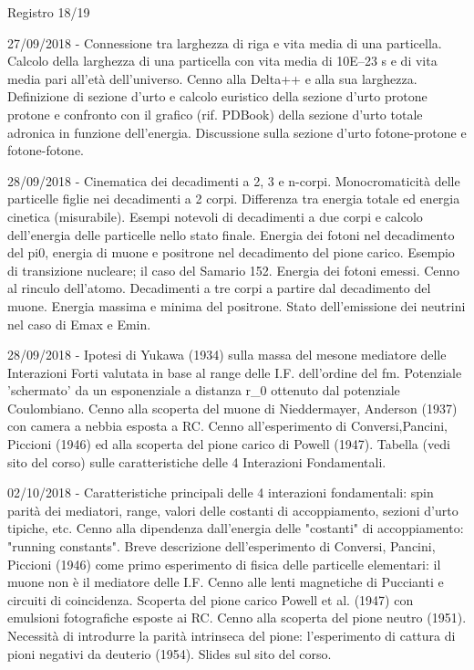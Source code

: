 \begin{frame}{Registro 18/19}
\begin{itemize}
{\item 27/09/2018 - Connessione tra larghezza di riga e vita media di una particella. Calcolo della larghezza di una particella con vita media di 10E–23 s e di vita media pari all’età dell’universo. Cenno alla Delta++ e alla sua larghezza. Definizione di sezione d’urto e calcolo euristico della sezione d’urto protone protone e confronto con il grafico (rif. PDBook) della sezione d’urto totale adronica in funzione dell’energia. Discussione sulla sezione d’urto fotone-protone e fotone-fotone.
\item 28/09/2018 - Cinematica dei decadimenti a 2, 3 e n-corpi. Monocromaticità delle particelle figlie nei decadimenti a 2 corpi. Differenza tra energia totale ed energia cinetica (misurabile). Esempi notevoli di decadimenti a due corpi e calcolo dell'energia delle particelle nello stato finale. Energia dei fotoni nel decadimento del pi0, energia di muone e positrone nel decadimento del pione carico. Esempio di transizione nucleare; il caso del Samario 152. Energia dei fotoni emessi. Cenno al rinculo dell'atomo. Decadimenti a tre corpi a partire dal decadimento del muone. Energia massima e minima del positrone. Stato dell'emissione dei neutrini nel caso di Emax e Emin.
\item 28/09/2018 - Ipotesi di Yukawa (1934) sulla massa del mesone mediatore delle Interazioni Forti valutata in base al range delle I.F. dell'ordine del fm. Potenziale 'schermato' da un esponenziale a distanza r_0 ottenuto dal potenziale Coulombiano. Cenno alla scoperta del muone di Nieddermayer, Anderson (1937) con camera a nebbia esposta a RC. Cenno all'esperimento di Conversi,Pancini, Piccioni (1946) ed alla scoperta del pione carico di Powell (1947). Tabella (vedi sito del corso) sulle caratteristiche delle 4 Interazioni Fondamentali.
\item 02/10/2018 - Caratteristiche principali delle 4 interazioni fondamentali: spin parità dei mediatori, range, valori delle costanti di accoppiamento, sezioni d'urto tipiche, etc. Cenno alla dipendenza dall'energia delle "costanti" di accoppiamento: "running constants". Breve descrizione dell'esperimento di Conversi, Pancini, Piccioni (1946) come primo esperimento di fisica delle particelle elementari: il muone non è il mediatore delle I.F. Cenno alle lenti magnetiche di Puccianti e circuiti di coincidenza. Scoperta del pione carico Powell et al. (1947) con emulsioni fotografiche esposte ai RC. Cenno alla scoperta del pione neutro (1951). Necessità di introdurre la parità intrinseca del pione: l'esperimento di cattura di pioni negativi da deuterio (1954). Slides sul sito del corso.
}
\end{itemize}
\end{frame}
